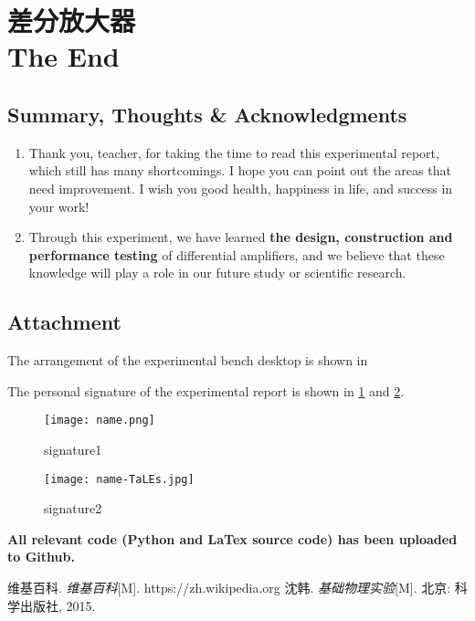 
\section{差分放大器 \\ The End}


\subsection{Summary, Thoughts \& Acknowledgments}
\begin{enumerate}
	\item Thank you, teacher, for taking the time to read this experimental report, which still has many shortcomings. I hope you can point out the areas that need improvement. I wish you good health, happiness in life, and success in your work!
	\item Through this experiment, we have learned \textbf{the design, construction and performance testing} of differential amplifiers, and we believe that these knowledge will play a role in our future study or scientific research.
\end{enumerate}


\subsection{Attachment}
The arrangement of the experimental bench desktop is shown in %

The personal signature of the experimental report is shown in \cref{fig:name1} and \cref{fig:name2}.

\begin{figure}[htbp]
	\centering
	\texttt{[image: name.png]}
	\caption{signature1}
	\label{fig:name1}
\end{figure}

\begin{figure}[htbp]
	\centering
	\texttt{[image: name-TaLEs.jpg]}
	\caption{signature2}
	\label{fig:name2}
\end{figure}

\textbf{All relevant code (Python and LaTex source code) has been uploaded to Github.}


\renewcommand{\refname}{Reference}
\begin{thebibliography}{99}	
	 维基百科. \emph{维基百科}[M]. https://zh.wikipedia.org
	 沈韩. \emph{基础物理实验}[M]. 北京: 科学出版社, 2015.	
\end{thebibliography}